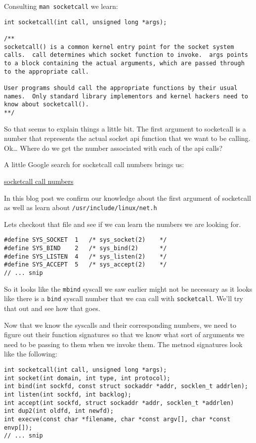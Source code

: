 \documentclass[11pt]{article}
\begin{document}
Consulting \verb~man socketcall~ we learn:

\begin{verbatim}
int socketcall(int call, unsigned long *args);

/**
socketcall() is a common kernel entry point for the socket system
calls.  call determines which socket function to invoke.  args points
to a block containing the actual arguments, which are passed through
to the appropriate call.

User programs should call the appropriate functions by their usual
names.  Only standard library implementors and kernel hackers need to
know about socketcall().
**/
\end{verbatim}

So that seems to explain things a little bit. The first argument to
socketcall is a number that represents the actual socket api function
that we want to be calling. Ok\ldots{} Where do we get the number associated
with each of the api calls?

A little Google search for socketcall call numbers brings us:

\href{http://jkukunas.blogspot.com/2010/05/x86-linux-networking-system-calls.html}{socketcall call numbers}

In this blog post we confirm our knowledge about the first argument of
socketcall as well as learn about \verb~/usr/include/linux/net.h~

Lets checkout that file and see if we can learn the numbers we are looking
for.

\begin{verbatim}
#define SYS_SOCKET  1   /* sys_socket(2)    */
#define SYS_BIND    2   /* sys_bind(2)      */
#define SYS_LISTEN  4   /* sys_listen(2)    */
#define SYS_ACCEPT  5   /* sys_accept(2)    */
// ... snip
\end{verbatim}

So it looks like the \verb~mbind~ syscall we saw earlier might not be
necessary as it looks like there is a \verb~bind~ syscall number that we
can call with \verb~socketcall~.  We'll try that out and see how that goes.

Now that we know the syscalls and their corresponding numbers, we need
to figure out their function signatures so that we know what sort of
arguments we need to be passing to them when we invoke them. The
metnod signatures look like the following:


\begin{verbatim}
int socketcall(int call, unsigned long *args);
int socket(int domain, int type, int protocol);
int bind(int sockfd, const struct sockaddr *addr, socklen_t addrlen);
int listen(int sockfd, int backlog);
int accept(int sockfd, struct sockaddr *addr, socklen_t *addrlen)
int dup2(int oldfd, int newfd);
int execve(const char *filename, char *const argv[], char *const envp[]);
// ... snip
\end{verbatim}
\end{document}

